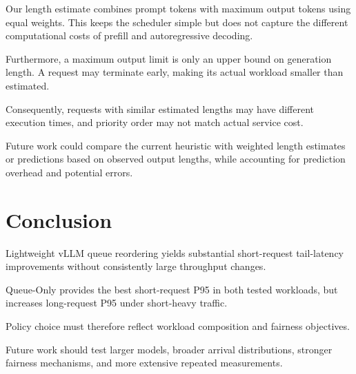 \documentclass[sigplan,nonacm]{acmart}
\begin{document}
Our length estimate combines prompt tokens
with maximum output tokens using equal weights.
This keeps the scheduler simple but does not
capture the different computational costs
of prefill and autoregressive decoding.

Furthermore, a maximum output limit is
only an upper bound on generation length.
A request may terminate early, making its
actual workload smaller than estimated.

Consequently, requests with similar
estimated lengths may have different
execution times, and priority order
may not match actual service cost.

Future work could compare the current
heuristic with weighted length estimates
or predictions based on observed output
lengths, while accounting for prediction
overhead and potential errors.


\section{Conclusion}

Lightweight vLLM queue reordering yields
substantial short-request tail-latency
improvements without consistently large
throughput changes.

Queue-Only provides the best short-request
P95 in both tested workloads, but increases
long-request P95 under short-heavy traffic.

Policy choice must therefore reflect workload
composition and fairness objectives.

Future work should test larger models,
broader arrival distributions, stronger
fairness mechanisms, and more extensive
repeated measurements.


\FloatBarrier
\end{document}
